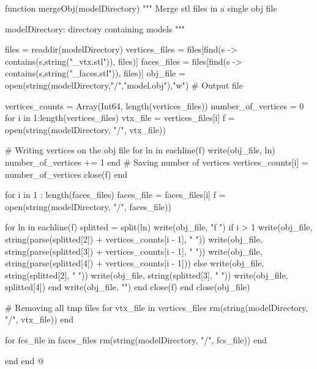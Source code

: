 \documentclass[11pt,oneside]{article}	%
\begin{document}
{function mergeObj(modelDirectory)
  """
  Merge stl files in a single obj file

  modelDirectory: directory containing models
  """

  files = readdir(modelDirectory)
  vertices_files = files[find(s -> contains(s,string("_vtx.stl")), files)]
  faces_files = files[find(s -> contains(s,string("_faces.stl")), files)]
  obj_file = open(string(modelDirectory,"/","model.obj"),"w") # Output file

  vertices_counts = Array(Int64, length(vertices_files))
  number_of_vertices = 0
  for i in 1:length(vertices_files)
    vtx_file = vertices_files[i]
    f = open(string(modelDirectory, "/", vtx_file))

    # Writing vertices on the obj file
    for ln in eachline(f)
      write(obj_file, ln)
      number_of_vertices += 1
    end
    # Saving number of vertices
    vertices_counts[i] = number_of_vertices
    close(f)
  end

  for i in 1 : length(faces_files)
    faces_file = faces_files[i]
    f = open(string(modelDirectory, "/", faces_file))

    for ln in eachline(f)
      splitted = split(ln)
      write(obj_file, "f ")
      if i > 1
        write(obj_file, string(parse(splitted[2]) + vertices_counts[i - 1], " "))
        write(obj_file, string(parse(splitted[3]) + vertices_counts[i - 1], " "))
        write(obj_file, string(parse(splitted[4]) + vertices_counts[i - 1]))
      else
        write(obj_file, string(splitted[2], " "))
        write(obj_file, string(splitted[3], " "))
        write(obj_file, splitted[4])
      end
      write(obj_file, "\n")
    end
    close(f)
  end
  close(obj_file)

  # Removing all tmp files
  for vtx_file in vertices_files
    rm(string(modelDirectory, "/", vtx_file))
  end

  for fcs_file in faces_files
    rm(string(modelDirectory, "/", fcs_file))
  end

end
end
@}
\end{document}
